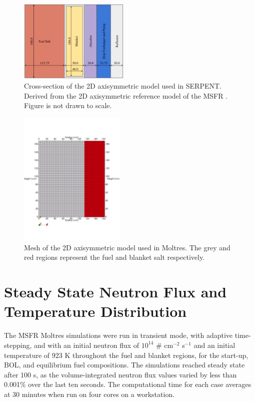 \documentclass{anstrans}
\begin{document}
\begin{figure}[t] 
	\centering
	\includegraphics[width=0.47\textwidth]{./figures/reference}
	\captionsetup{justification=centering}
	\caption{Cross-section of the 2D axisymmetric model used in SERPENT.
	Derived from the 2D axisymmetric reference model of the MSFR
	\cite{pettersen_coupled_2016}. Figure is not drawn to scale.}
	\label{fig:reference}
\end{figure} 
%
\begin{figure}[t] 
	\centering
	\includegraphics[width=0.45\textwidth]{./figures/mesh}
	\captionsetup{justification=centering}
	\caption{Mesh of the 2D axisymmetric model used in Moltres.
	The grey and red regions represent the fuel and blanket salt respectively.}
	\label{fig:mesh}
\end{figure} 

\section{Steady State Neutron Flux and Temperature Distribution}

	The \gls{MSFR} Moltres simulations were run in transient mode, with
	adaptive time-stepping, and with an
	initial neutron flux of $10^{14}$
	\# cm$^{-2}$ s$^{-1}$ and an initial temperature of 923 K throughout the
	fuel and blanket regions, for the start-up, \gls{BOL}, and equilibrium
	fuel compositions. The simulations reached steady state after 100 s, as the
	volume-integrated neutron flux values varied by less than 0.001\% over the
	last ten seconds. The computational time for each case averages at 30
	minutes when run on four cores on a workstation.
	
\end{document}
